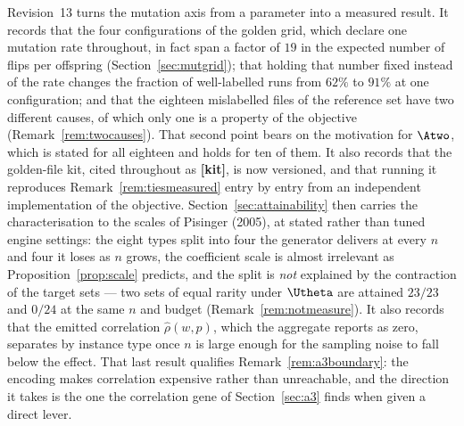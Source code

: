 %
%



Revision~13 turns the mutation axis from a parameter into a measured result. It records that
the four configurations of the golden grid, which declare one mutation rate throughout, in
fact span a factor of $19$ in the expected number of flips per offspring
(Section~\ref{sec:mutgrid}); that holding that number fixed instead of the rate changes the
fraction of well-labelled runs from $62\%$ to $91\%$ at one configuration; and that the
eighteen mislabelled files of the reference set have two different causes, of which only one
is a property of the objective (Remark~\ref{rem:twocauses}). That second point bears on the
motivation for $\Atwo$, which is stated for all eighteen and holds for ten of them. It also
records that the golden-file kit, cited throughout as \textbf{[kit]}, is now versioned, and
that running it reproduces Remark~\ref{rem:tiesmeasured} entry by entry from an independent
implementation of the objective. Section~\ref{sec:attainability} then carries the
characterisation to the scales of Pisinger (2005), at stated rather than tuned engine settings:
the eight types split into four the generator delivers at every $n$ and four it loses as $n$
grows, the coefficient scale is almost irrelevant as Proposition~\ref{prop:scale} predicts, and
the split is \emph{not} explained by the contraction of the target sets --- two sets of equal
rarity under $\Utheta$ are attained $23/23$ and $0/24$ at the same $n$ and budget
(Remark~\ref{rem:notmeasure}). It also records that the emitted correlation $\hat\rho(w,p)$,
which the aggregate reports as zero, separates by instance type once $n$ is large enough for
the sampling noise to fall below the effect. That last result qualifies
Remark~\ref{rem:a3boundary}: the encoding makes correlation expensive rather than unreachable,
and the direction it takes is the one the correlation gene of Section~\ref{sec:a3} finds when
given a direct lever.


